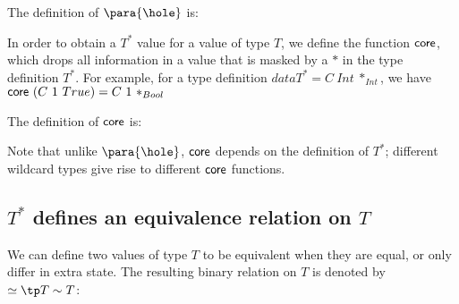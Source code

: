 The definition of $\para{\hole}$ is:



In order to obtain a $T^*$ value for a value of type $T$, we define the function ${\mathsf {core}}$, which drops all information in a value that is masked by a $*$ in the type definition $T^*$. For example, for a type definition $data T^* = C~Int~*_{Int}$, we have ${\mathsf {core}}~(C~1~True) = C~1~*_{Bool}$

The definition of ${\mathsf {core}}$ is:



Note that unlike $\para{\hole}$, ${\mathsf {core}}$ depends on the definition of $T^*$; different wildcard types give rise to different ${\mathsf {core}}$ functions.


\subsection{$T^*$ defines an equivalence relation on $T$}

We can define two values of type $T$ to be equivalent when they are equal, or only differ in extra state. The resulting binary relation on $T$ is denoted by $\eqstar \tp T \rel T$:


